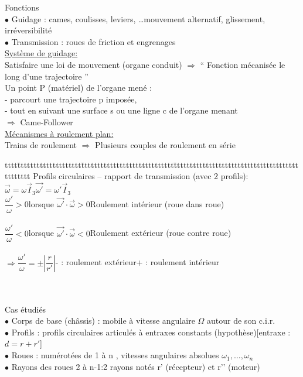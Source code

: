 {\color{orange}Fonctions}\\
$\bullet$ Guidage : cames, coulisses, leviers, …mouvement alternatif, glissement, irréversibilité\\
$\bullet$ Transmission : roues de friction et engrenages\\

\underline{Système de guidage:}\\
{\color{orange}Satisfaire une loi de mouvement (organe conduit)} $\Rightarrow$ “ Fonction mécanisée le long d’une trajectoire ”\\
Un point P (matériel) de l’organe mené :\\
- parcourt une trajectoire p imposée,\\
- tout en suivant une surface s ou une ligne c de l’organe menant\\

$\Rightarrow$ Came-Follower\\

\underline{Mécanismes à roulement plan:}\\
Trains de roulement $\Rightarrow$ Plusieurs couples de roulement en série\\

\begin{bluebox}
\begin{tabbing}
tttt\=tttttttttttttttttttt\=ttttttttttttttttttttttttttttt\=ttttttttttttttttttttttttttttttttttttttttttttttt\kill
Profils circulaires – rapport de transmission (avec 2 profils):\\
\>$\vec{\omega}=\omega\vec{I}_3$\>$\vec{\omega'}=\omega'\vec{I}_3$\\
\>$\dfrac{\omega'}{\omega}>0$\>lorsque $\vec{\omega'}\cdot\vec{\omega}>0$\>Roulement {\color{orange}intérieur} (roue dans roue)\\\\
\>$\dfrac{\omega'}{\omega}<0$\>lorsque $\vec{\omega'}\cdot\vec{\omega}<0$\>Roulement {\color{orange}extérieur} (roue contre roue)\\\\
$\Rightarrow \dfrac{\omega'}{\omega} = \pm \left|\dfrac{r}{r'}\right|$\>\>- : roulement extérieur\>+ : roulement intérieur
\end{tabbing}
\end{bluebox}\\\\

{\color{orange}Cas étudiés}\\
$\bullet$ Corps de base (châssis) : mobile à vitesse angulaire $\Omega$ autour de son c.i.r.\\
$\bullet$ Profils : profils circulaires articulés à entraxes constants (hypothèse)[entraxe : $d=r+r'$]\\
$\bullet$ Roues : numérotées de 1 à n , vitesses angulaires absolues $\omega_1,…, \omega_n$\\
$\bullet$ Rayons des roues 2 à n-1:2 rayons notés r’ (récepteur) et r’’ (moteur)\\


